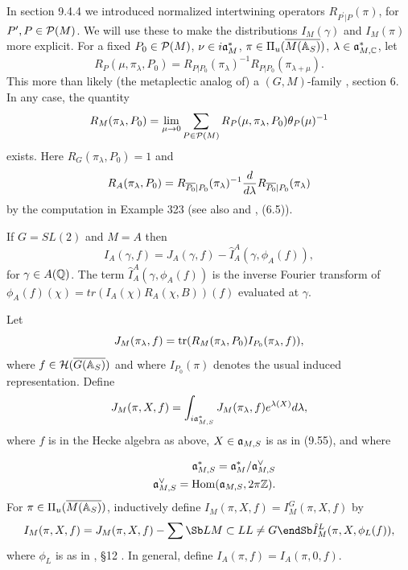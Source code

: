 In section 9.4.4 we introduced normalized intertwining operators
$R_{P^{\prime}|P}(\pi)$, for $P^{\prime},P\in {\cal P}(M)$.
We will use these to make the distributions
$I_M(\gamma)$ and $I_M(\pi)$ more explicit.
For a fixed $P_0\in {\cal P}(M)$,
$\nu\in i{\frak{a}}_M^*$,
$\pi\in \Pi_u(\overline{M({\Bbb{A}}_S)})$,
$\lambda\in {\frak{a}}_{M,{\Bbb{C}}}^*$, let
\begin{equation}
R_P(\mu,\pi_\lambda,P_0)
=R_{P|P_0}(\pi_\lambda)^{-1}R_{P|P_0}(\pi_{\lambda+\mu}) .
\end{equation}
This more than likely (the metaplectic analog of) a
$(G,M)$-family \cite{A11}, section 6. In any case, the quantity
\[
R_M(\pi_\lambda,P_0)
=\lim_{\mu\rightarrow 0}
\sum_{P\in {\cal P}(M)}
R_P(\mu,\pi_\lambda,P_0)\theta_P(\mu)^{-1}
\]
exists. Here $R_G(\pi_\lambda,P_0)=1$ and
\[
R_A(\pi_\lambda,P_0)=
R_{\overline{P_0}|P_0}(\pi_\lambda)^{-1}
{d\over d\lambda}
R_{\overline{P_0}|P_0}(\pi_\lambda)
\]
by the computation in Example 323 (see also \cite{A11} and
\cite{A6}, (6.5)).

\begin{example}
If $G=SL(2)$ and $M=A$ then
\[
I_A(\gamma,f)
=J_A(\gamma,f)-
\hat{I}_A^A(\gamma,\phi_A(f)),
\]
for $\gamma\in A({\Bbb{Q}})$.
The term $\hat{I}_A^A(\gamma,\phi_A(f))$
is the inverse Fourier transform of
$\phi_A(f)(\chi)=tr(I_A(\chi)R_A(\chi,B))(f)$ evaluated at
$\gamma$. 
\end{example}

Let
\begin{equation}
J_M(\pi_\lambda,f)=
{\rm tr}(R_M(\pi_\lambda,P_0)
I_{P_0}(\pi_\lambda,f)),
\end{equation}
where $f\in {\cal{H}}(\overline{G({\Bbb{A}}_S)})$ and where
$I_{P_0}(\pi)$ denotes the usual induced representation.
Define
\begin{equation}
J_M(\pi,X,f)
=\int_{i{\frak{a}}^*_{M,S}}
J_M(\pi_\lambda,f)e^{\lambda(X)}d\lambda,
\end{equation}
where $f$ is in the Hecke algebra as above, $X\in {\frak{a}}_{M,S}$
is as in (9.55), and where

\begin{eqnarray*}
&&{\frak{a}}^*_{M,S}
={\frak{a}}^*_{M}/{\frak{a}}^{\vee}_{M,S}\\
&&{\frak{a}}^{\vee}_{M,S}={\rm Hom}({\frak{a}}_{M,S},2\pi {\Bbb Z}).
\end{eqnarray*}
For
$\pi\in \Pi_u(\overline{M({\Bbb{A}}_S)})$,
inductively define $I_M(\pi,X,f)=I_M^G(\pi,X,f)$ by
\begin{equation}
I_M(\pi,X,f)
=J_M(\pi,X,f)-
\sum\Sb L\\ M\subset L\\ L\not= G\endSb
\hat{I}_M^L(\pi,X,\phi_L(f)),
\end{equation}
where $\phi_L$ is as in \cite{A11}, \S 12 .
In general, define $I_A(\pi,f)=I_A(\pi,0,f)$.

